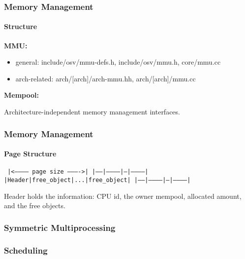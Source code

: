 \documentclass[10pt]{beamer}
\begin{document}
\begin{frame}
	\frametitle{Memory Management}
	\framesubtitle{Structure}
	
	\textbf{MMU: }
	\begin{itemize}
		\item general: include/osv/mmu-defs.h, include/osv/mmu.h, core/mmu.cc
		\item arch-related: arch/[arch]/arch-mmu.hh, arch/[arch]/mmu.cc
	\end{itemize}
	
	\smallskip
	
	\textbf{Mempool: }
	
	Architecture-independent memory management interfaces.
	
\end{frame}


\begin{frame}
	\frametitle{Memory Management}
	\framesubtitle{Page Structure}
	
	\center
	\texttt{
	|<----------- page size ---------->|
	|------|-----------|---|-----------|
	|Header|free\_object|...|free\_object|
	|------|-----------|---|-----------|
	}
	
\medskip

	Header holds the information: CPU id, the owner mempool, allocated amount, and the free objects.
	
\end{frame}



\begin{frame}
	\frametitle{Symmetric Multiprocessing}
  
	
\end{frame}



\begin{frame}
	\frametitle{Scheduling}


\end{frame}
\end{document}

